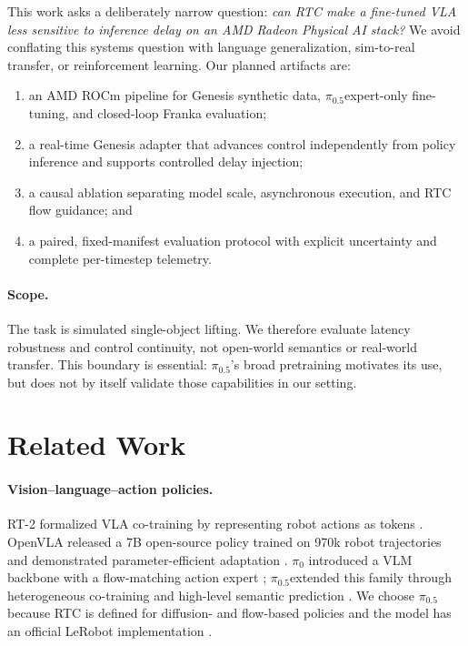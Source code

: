 \documentclass[10pt,twocolumn]{article}
\newcommand{\pifive}{$\pi_{0.5}$}
\begin{document}
This work asks a deliberately narrow question: \emph{can RTC make a
fine-tuned VLA less sensitive to inference delay on an AMD Radeon Physical AI
stack?}  We avoid conflating this systems question with language
generalization, sim-to-real transfer, or reinforcement learning.  Our
planned artifacts are:

\begin{enumerate}[leftmargin=*,itemsep=2pt]
  \item an AMD ROCm pipeline for Genesis synthetic data, \pifive expert-only
        fine-tuning, and closed-loop Franka evaluation;
  \item a real-time Genesis adapter that advances control independently from
        policy inference and supports controlled delay injection;
  \item a causal ablation separating model scale, asynchronous execution, and
        RTC flow guidance; and
  \item a paired, fixed-manifest evaluation protocol with explicit uncertainty
        and complete per-timestep telemetry.
\end{enumerate}

\paragraph{Scope.}
The task is simulated single-object lifting.  We therefore evaluate latency
robustness and control continuity, not open-world semantics or real-world
transfer.  This boundary is essential: \pifive's broad pretraining motivates
its use, but does not by itself validate those capabilities in our setting.

\section{Related Work}

\paragraph{Vision--language--action policies.}
RT-2 formalized VLA co-training by representing robot actions as tokens
\cite{zitkovich2023rt2}.  OpenVLA released a 7B open-source policy trained on
970k robot trajectories and demonstrated parameter-efficient adaptation
\cite{kim2024openvla}.  $\pi_0$ introduced a VLM backbone with a flow-matching
action expert \cite{black2024pi0,lipman2023flow}; \pifive extended this family
through heterogeneous co-training and high-level semantic prediction
\cite{black2025pi05}.  We choose \pifive because RTC is defined for diffusion-
and flow-based policies and the model has an official LeRobot implementation
\cite{lerobot2026pi05docs}.
\end{document}
